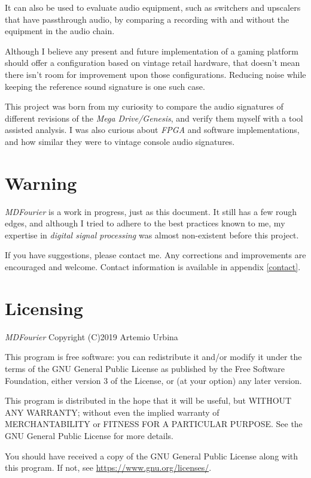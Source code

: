 \documentclass[10pt,a4paper]{report}
\begin{document}
It can also be used to evaluate audio equipment, such as switchers and upscalers that have passthrough audio, by comparing a recording with and without the equipment in the audio chain.

Although I believe any present and future implementation of a gaming platform should offer a configuration based on vintage retail hardware, that doesn't mean there isn't room for improvement upon those configurations. Reducing noise while keeping the reference sound signature is one such case.

This project was born from my curiosity to compare the audio signatures of different revisions of the  \textit{Mega Drive/Genesis}, and verify them myself with a tool assisted analysis. I was also curious about \textit{FPGA} and software implementations, and how similar they were to vintage console audio signatures.

\section{Warning}

\textit{MDFourier} is a work in progress, just as this document. It still has a few rough edges, and although I tried to adhere to the best practices known to me, my expertise in \textit{digital signal processing} was almost non-existent before this project. 

If you have suggestions, please contact me. Any corrections and improvements are encouraged and welcome. Contact information is available in appendix \ref{contact}.

\section{Licensing}

\textit{MDFourier} Copyright (C)2019 Artemio Urbina

This program is free software: you can redistribute it and/or modify
it under the terms of the GNU General Public License as published by
the Free Software Foundation, either version 3 of the License, or
(at your option) any later version.

This program is distributed in the hope that it will be useful,
but WITHOUT ANY WARRANTY; without even the implied warranty of
MERCHANTABILITY or FITNESS FOR A PARTICULAR PURPOSE.  See the
GNU General Public License for more details.

You should have received a copy of the GNU General Public License
along with this program.  If not, see \url{https://www.gnu.org/licenses/}.
\end{document}
